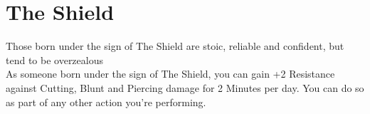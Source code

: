 \section{The Shield}

Those born under the sign of The Shield are stoic, reliable and confident, but tend to be overzealous\\
As someone born under the sign of The Shield, you can gain +2 Resistance against Cutting, Blunt and Piercing damage for 2 Minutes per day. You can do so as part of any other action you're performing.\\